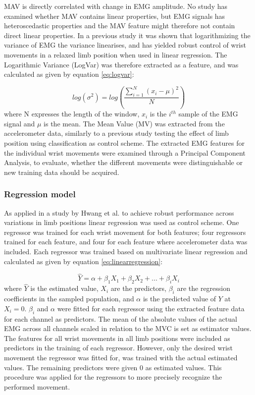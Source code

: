 \begin{multicols}{2}
MAV is directly correlated with change in EMG amplitude. No study has examined whether MAV contains linear properties, but EMG signals has heteroscedastic properties \cite{rasool2012} and the MAV feature might therefore not contain direct linear properties.
In a previous study \cite{hahne2014} it was shown that logarithmizing the variance of EMG the variance linearises, and has yielded robust control of wrist movements in a relaxed limb position when used in linear regression. The Logarithmic Variance (LogVar) was therefore extracted as a feature, and was calculated as given by equation \ref{eq:logvar}:

\begin{equation} \label{eq:logvar}
log(\sigma^2) = log(\frac{\sum\limits_{i=1}^N(x_i - \mu)^2}{N})
\end{equation}
where N expresses the length of the window, $x_i$ is the $i^{th}$ sample of the EMG signal and $\mu$ is the mean.
The Mean Value (MV) was extracted from the accelerometer data, similarly to a previous study \cite{Krasoulis2015} testing the effect of limb position using classification as control scheme. 
The extracted EMG features for the individual wrist movements were examined through a Principal Component Analysis, to evaluate, whether the different movements were distinguishable or new training data should be acquired.

\subsubsection*{Regression model}
As applied in a study by Hwang et al. \cite{Hwang2017} to achieve robust performance across variations in limb positions linear regression was used as control scheme. One regressor was trained for each wrist movement for both features; four regressors trained for each feature, and four for each feature where accelerometer data was included. Each regressor was trained based on multivariate linear regression and calculated as given by equation \ref{eq:linearregression}:

\begin{equation} \label{eq:linearregression}
\hat{Y} = \alpha + \beta_1 X_{1} + \beta_2 X_{2} + ... + \beta_i X_{i}
\end{equation}
where $\hat{Y}$ is the estimated value, $X_i$ are the predictors, $\beta_i$ are the regression coefficients in the sampled population, and $\alpha$ is the predicted value of $Y$ at $X_{i} = 0$. $\beta_i$ and $\alpha$ were fitted for each regressor using the extracted feature data for each channel as predictors. The mean of the absolute values of the actual EMG across all channels scaled in relation to the MVC is set as estimator values. The features for all wrist movements in all limb positions were included as predictors in the training of each regressor. However, only the desired wrist movement the regressor was fitted for, was trained with the actual estimated values. The remaining predictors were given 0 as estimated values. This procedure was applied for the regressors to more precisely recognize the performed movement.


\end{multicols}
